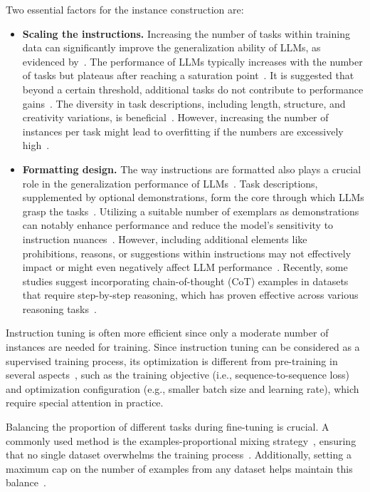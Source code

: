 Two essential factors for the instance construction are:
\begin{itemize}
	\item \textbf{Scaling the instructions.} {Increasing the number of tasks within training data can significantly improve the generalization ability of LLMs, as evidenced by~\textcite{wei2022fine, sanh2021distilbert, chowdhery2022palm}. The performance of LLMs typically increases with the number of tasks but plateaus after reaching a saturation point~\cite{raffel2023exploring, chowdhery2022palm}. It is suggested that beyond a certain threshold, additional tasks do not contribute to performance gains~\cite{raffel2023exploring}. The diversity in task descriptions, including length, structure, and creativity variations, is beneficial~\cite{wei2022fine}. However, increasing the number of instances per task might lead to overfitting if the numbers are excessively high~\cite{chowdhery2022palm, chen2023maybe}.}
	\item \textbf{Formatting design.} {
		      The way instructions are formatted also plays a crucial role in the generalization performance of LLMs~\cite{chowdhery2022palm}. Task descriptions, supplemented by optional demonstrations, form the core through which LLMs grasp the tasks~\cite{chowdhery2022palm}. Utilizing a suitable number of exemplars as demonstrations can notably enhance performance and reduce the model's sensitivity to instruction nuances~\cite{sanh2021distilbert, raffel2023exploring}. However, including additional elements like prohibitions, reasons, or suggestions within instructions may not effectively impact or might even negatively affect LLM performance~\cite{chowdhery2022palm, mishra2022crosstask}. Recently, some studies suggest incorporating chain-of-thought (CoT) examples in datasets that require step-by-step reasoning, which has proven effective across various reasoning tasks~\cite{raffel2023exploring, iyer2022opt}.
	      }
\end{itemize}

Instruction tuning is often more efficient since only a moderate number of instances are needed for training.
Since instruction tuning can be considered as a supervised training process, its optimization is different from pre-training in several aspects~\cite{chung2022scaling}, such as the training objective (i.e., sequence-to-sequence loss) and optimization
configuration (e.g., smaller batch size and learning rate), which require special attention in practice.

Balancing the proportion of different tasks during fine-tuning is crucial.
A commonly used method is the examples-proportional mixing strategy~\cite{raffel2023exploring}, ensuring that no single dataset overwhelms the training process~\cite{raffel2023exploring, wei2022fine}.
Additionally, setting a maximum cap on the number of examples from any dataset helps maintain this balance~\cite{raffel2023exploring, wei2022fine}.

